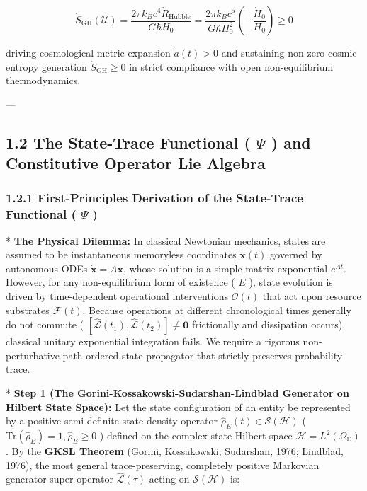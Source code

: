 \documentclass[11pt,a4paper]{article}
\theoremstyle{definition}
\theoremstyle{remark}
\begin{document}
\begin{equation}
\boxed{\dot{S}_{\text{GH}}(\mathcal{U}) = \frac{2\pi k_B c^4 \dot{R}_{\text{Hubble}}}{G \hbar H_0} = \frac{2\pi k_B c^5}{G \hbar H_0^2} \left( -\frac{\dot{H}_0}{H_0} \right) \ge 0}
\end{equation}


driving cosmological metric expansion $\dot{a}(t) > 0$ and sustaining non-zero cosmic entropy generation $\dot{S}_{\text{GH}} \ge 0$ in strict compliance with open non-equilibrium thermodynamics.

---

\subsection{1.2 The State-Trace Functional ( $\Psi$ ) and Constitutive Operator Lie Algebra}

\subsubsection{1.2.1 First-Principles Derivation of the State-Trace Functional ( $\Psi$ )}
* \textbf{The Physical Dilemma:} In classical Newtonian mechanics, states are assumed to be instantaneous memoryless coordinates $\mathbf{x}(t)$ governed by autonomous ODEs $\dot{\mathbf{x}} = A \mathbf{x}$, whose solution is a simple matrix exponential $e^{At}$. However, for any non-equilibrium form of existence ( $E$ ), state evolution is driven by time-dependent operational interventions $\mathcal{O}(t)$ that act upon resource substrates $\mathcal{F}(t)$. Because operations at different chronological times generally do not commute ( $[ \hat{\mathcal{L}}(t_1), \hat{\mathcal{L}}(t_2) ] \neq \mathbf{0}$ frictionally and dissipation occurs), classical unitary exponential integration fails. We require a rigorous non-perturbative path-ordered state propagator that strictly preserves probability trace.

* \textbf{Step 1 (The Gorini-Kossakowski-Sudarshan-Lindblad Generator on Hilbert State Space):}
Let the state configuration of an entity be represented by a positive semi-definite state density operator $\hat{\rho}_E(t) \in \mathcal{S}(\mathcal{H})$ ( $\mathrm{Tr}(\hat{\rho}_E) = 1, \hat{\rho}_E \ge 0$ ) defined on the complex state Hilbert space $\mathcal{H} = L^2(\Omega_{\mathbb{C}})$. By the \textbf{GKSL Theorem} (Gorini, Kossakowski, Sudarshan, 1976; Lindblad, 1976), the most general trace-preserving, completely positive Markovian generator super-operator $\hat{\mathcal{L}}(\tau)$ acting on $\mathcal{S}(\mathcal{H})$ is:
\end{document}
